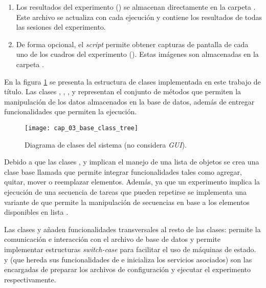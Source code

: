 \documentclass[\main/main.tex]{subfiles}
\begin{document}
\begin{enumerate}
				\item Los resultados del experimento () se almacenan directamente en la carpeta . Este archivo se actualiza con cada ejecución y contiene los resultados de todas las sesiones del experimento. 

				\item De forma opcional, el \textit{script} permite obtener capturas de pantalla de cada uno de los cuadros del experimento (). Estas imágenes son almacenadas en la carpeta . 
			\end{enumerate}

			En la figura \ref{fig:03_base_class_tree} se presenta la estructura de clases implementada en este trabajo de título. Las clases , , ,  y  representan el conjunto de métodos que permiten la manipulación de los datos almacenados en la base de datos, además de entregar funcionalidades que permiten la ejecución. 
			\begin{figure}[H]
				\centering
				\texttt{[image: cap\_03\_base\_class\_tree]}
				\caption{Diagrama de clases del sistema (no considera \textit{GUI}).}
				\label{fig:03_base_class_tree}
			\end{figure} 

			Debido a que las clases ,  y  implican el manejo de una lista de objetos se crea una clase base llamada  que permite integrar funcionalidades tales como agregar, quitar, mover o reemplazar elementos. Además, ya que un experimento implica la ejecución de una secuencia de tareas que pueden repetirse se implementa una variante de  que permite la manipulación de secuencias en base a los elementos disponibles en lista .

			Las clases  y  añaden funcionalidades transversales al resto de las clases:  permite la comunicación e interacción con el archivo de base de datos y  permite implementar estructuras \textit{switch-case} para facilitar el uso de máquinas de estado.  y  (que hereda sus funcionalidades de  e inicializa los servicios asociados) son las encargadas de preparar los archivos de configuración y ejecutar el experimento respectivamente.   
\end{document}
